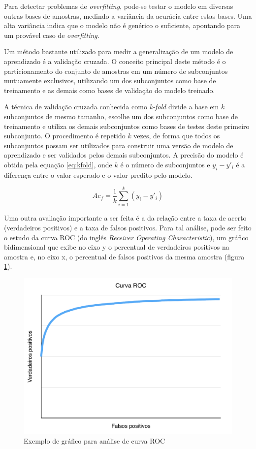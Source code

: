 Para detectar problemas de \textit{overfitting}, pode-se testar o modelo em diversas outras bases de amostras, medindo a variância da acurácia entre estas bases. Uma alta variância indica que o modelo não é genérico o suficiente, apontando para um provável caso de \textit{overfitting}.

Um método bastante utilizado para medir a generalização de um modelo de aprendizado é a validação cruzada. O conceito principal deste método é o particionamento do conjunto de amostras em um número de subconjuntos mutuamente exclusivos, utilizando um dos subconjuntos como base de treinamento e as demais como bases de validação do modelo treinado.

A técnica de validação cruzada conhecida como \textit{k-fold} divide a base em $k$ subconjuntos de mesmo tamanho, escolhe um dos subconjuntos como base de treinamento e utiliza os demais subconjuntos como bases de testes deste primeiro subconjunto. O procedimento é repetido $k$ vezes, de forma que todos os subconjuntos possam ser utilizados para construir uma versão de modelo de aprendizado e ser validados pelos demais subconjuntos. A precisão do modelo é obtida pela equação \ref{eq:kfold}, onde $k$ é o número de subconjuntos e $y_i - y'_i$ é a diferença entre o valor esperado e o valor predito pelo modelo.

\begin{equation}
  \displaystyle Ac_f = \frac{1}{k} \sum_{i=1}^k{(y_i - y'_i)}
\label{eq:kfold}
\end{equation}

Uma outra avaliação importante a ser feita é a da relação entre a taxa de acerto (verdadeiros positivos) e  a taxa de falsos positivos. Para tal análise, pode ser feito o estudo da curva ROC (do inglês \textit{Receiver Operating Characteristic}), um gráfico bidimensional que exibe no eixo y o percentual de verdadeiros positivos na amostra e, no eixo x, o percentual de falsos positivos da mesma amostra (figura \ref{fig:roc}).

\begin{figure}[h]
  \centering
  \includegraphics[scale=0.6]{imgs/roc}
  \caption{Exemplo de gráfico para análise de curva ROC}
  \label{fig:roc}
\end{figure}

